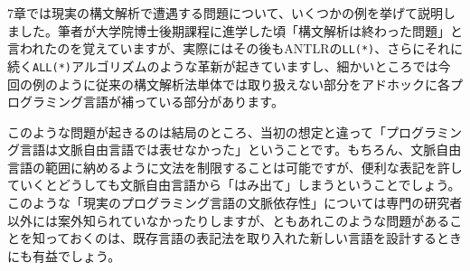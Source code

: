 7章では現実の構文解析で遭遇する問題について、いくつかの例を挙げて説明しました。筆者が大学院博士後期課程に進学した頃「構文解析は終わった問題」と言われたのを覚えていますが、実際にはその後もANTLRの\texttt{LL(*)}、さらにそれに続く\texttt{ALL(*)}アルゴリズムのような革新が起きていますし、細かいところでは今回の例のように従来の構文解析法単体では取り扱えない部分をアドホックに各プログラミング言語が補っている部分があります。

このような問題が起きるのは結局のところ、当初の想定と違って「プログラミング言語は文脈自由言語では表せなかった」ということです。もちろん、文脈自由言語の範囲に納めるように文法を制限することは可能ですが、便利な表記を許していくとどうしても文脈自由言語から「はみ出て」しまうということでしょう。このような「現実のプログラミング言語の文脈依存性」については専門の研究者以外には案外知られていなかったりしますが、ともあれこのような問題があることを知っておくのは、既存言語の表記法を取り入れた新しい言語を設計するときにも有益でしょう。
